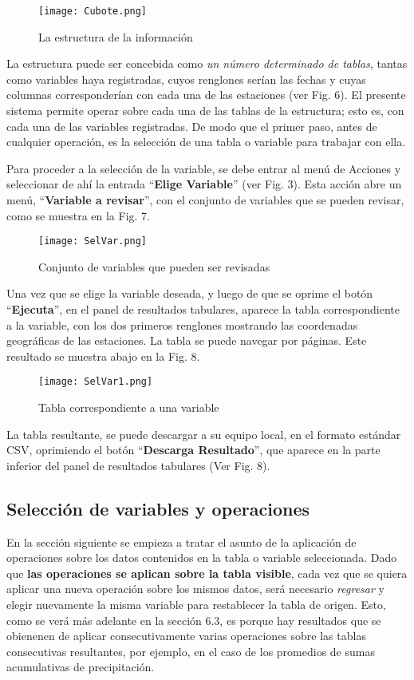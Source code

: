 \documentclass[spanish,]{article}
\begin{document}
\begin{figure}
\centering
\texttt{[image: Cubote.png]}
\caption{La estructura de la información}
\end{figure}

La estructura puede ser concebida como \emph{un número determinado de
tablas}, tantas como variables haya registradas, cuyos renglones serían
las fechas y cuyas columnas corresponderían con cada una de las
estaciones (ver Fig. 6). El presente sistema permite operar sobre cada
una de las tablas de la estructura; esto es, con cada una de las
variables registradas. De modo que el primer paso, antes de cualquier
operación, es la selección de una tabla o variable para trabajar con
ella.

Para proceder a la selección de la variable, se debe entrar al menú de
Acciones y seleccionar de ahí la entrada ``\textbf{Elige Variable}''
(ver Fig. 3). Esta acción abre un menú, ``\textbf{Variable a revisar}'',
con el conjunto de variables que se pueden revisar, como se muestra en
la Fig. 7.

\begin{figure}
\centering
\texttt{[image: SelVar.png]}
\caption{Conjunto de variables que pueden ser revisadas}
\end{figure}

Una vez que se elige la variable deseada, y luego de que se oprime el
botón ``\textbf{Ejecuta}'', en el panel de resultados tabulares, aparece
la tabla correspondiente a la variable, con los dos primeros renglones
mostrando las coordenadas geográficas de las estaciones. La tabla se
puede navegar por páginas. Este resultado se muestra abajo en la Fig. 8.

\begin{figure}
\centering
\texttt{[image: SelVar1.png]}
\caption{Tabla correspondiente a una variable}
\end{figure}

La tabla resultante, se puede descargar a su equipo local, en el formato
estándar CSV, oprimiendo el botón ``\textbf{Descarga Resultado}'', que
aparece en la parte inferior del panel de resultados tabulares (Ver Fig.
8).

\subsection{Selección de variables y
operaciones}\label{seleccion-de-variables-y-operaciones}

En la sección siguiente se empieza a tratar el asunto de la aplicación
de operaciones sobre los datos contenidos en la tabla o variable
seleccionada. Dado que \textbf{las operaciones se aplican sobre la tabla
visible}, cada vez que se quiera aplicar una nueva operación sobre los
mismos datos, será necesario \emph{regresar} y elegir nuevamente la
misma variable para restablecer la tabla de origen. Esto, como se verá
más adelante en la sección 6.3, es porque hay resultados que se
obienenen de aplicar consecutivamente varias operaciones sobre las
tablas consecutivas resultantes, por ejemplo, en el caso de los
promedios de sumas acumulativas de precipitación.
\end{document}
